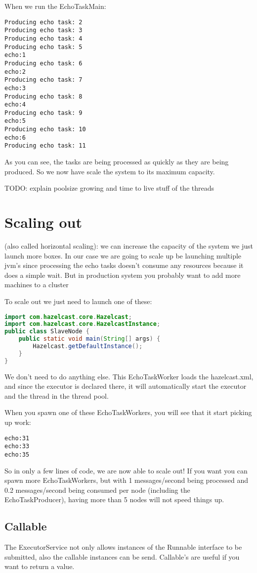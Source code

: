 When we run the EchoTaskMain:
\begin{verbatim}
Producing echo task: 2
Producing echo task: 3
Producing echo task: 4
Producing echo task: 5
echo:1
Producing echo task: 6
echo:2
Producing echo task: 7
echo:3
Producing echo task: 8
echo:4
Producing echo task: 9
echo:5
Producing echo task: 10
echo:6
Producing echo task: 11	
\end{verbatim}
As you can see, the tasks are being processed as quickly as they are being produced. So we now have scale the system to its maximum capacity.

TODO: explain poolsize growing and time to live stuff of the threads

\section{Scaling out}
(also called horizontal scaling): we can increase the capacity of the system we just launch more boxes. In our case we are going to scale up be launching multiple jvm's since processing the echo tasks doesn't consume any resources because it does a simple wait. But in production system you probably want to add more machines to a cluster

To scale out we just need to launch one of these:

\begin{lstlisting}[language=java]
import com.hazelcast.core.Hazelcast;
import com.hazelcast.core.HazelcastInstance;
public class SlaveNode {
    public static void main(String[] args) {
        Hazelcast.getDefaultInstance();
    }
}
\end{lstlisting}
We don't need to do anything else. This EchoTaskWorker loads the hazelcast.xml, and since the executor is declared there, it will automatically start the executor and the thread in the thread pool. 


When you spawn one of these EchoTaskWorkers, you will see that it start picking up work:
\begin{verbatim}
echo:31
echo:33
echo:35	
\end{verbatim}
So in only a few lines of code, we are now able to scale out! If you want you can spawn more EchoTaskWorkers, but with 1 messages/second being processed and 0.2 messages/second being consumed per node (including the EchoTaskProducer), having more than 5 nodes will not speed things up.

\subsection{Callable}
The ExecutorService not only allows instances of the Runnable interface to be submitted, also the callable instances can be send. Callable's are useful if you want to return a value.

